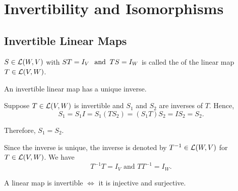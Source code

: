 \section{Invertibility and Isomorphisms}

\subsection{Invertible Linear Maps}
  \setcounter{thm}{58}
  \begin{mydef} 
    $S\in \mathcal{L}(W,V)$ with $ST=I_V \;\;\, \text{and}\;\; TS = I_W$ is called the  of the  linear map $T \in \mathcal{L}(V,W)$.
  \end{mydef}

  \begin{thm} 
    \label{thm: inverse is unique}
    An invertible linear map has a unique inverse.
  \end{thm}
  \begin{prf}
    Suppose $T\in {\mathcal{L}(V,W)}$ is invertible and $S_1$ and $S_2$ are inverses of $T$. Hence,
    \begin{equation}
      S_1 = S_1 I = S_1 (T S_2) = (S_1 T) S_2 = I S_2 = S_2.
    \end{equation}

    Therefore, $S_1 = S_2$.
  \end{prf}

  \begin{mydef} [notation $T^{-1}$]
    Since the inverse is unique, the inverse is denoted by $T^{-1}\in \mathcal{L}(W,V)$ for $T\in \mathcal{L}(V,W)$. We have
    \begin{equation}
      T^{-1}T=I_V \text{ and } T T^{-1} = I_W.
    \end{equation}
  \end{mydef}

  \begin{thm} 
    A linear map is invertible $\iff$ it is injective and surjective.
  \end{thm}

